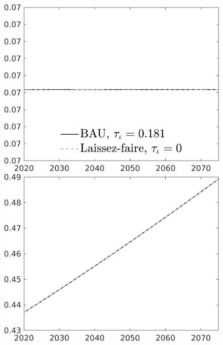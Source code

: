 \begin{figure}[h!!]
\begin{minipage}[]{0.32\textwidth}
\end{minipage}	
	\begin{minipage}[]{0.32\textwidth}
		\includegraphics[width=1\textwidth]{../../codding_model/own_basedOnFried/optimalPol_010922_revision/figures/all_13Sept22/CompTaul_Equlab_LFBAU_Reg0_GFF_spillover0_nsk1_xgr1_knspil1_sep1_countec0_GovRev1_etaa0.79_lgd1.png}
	\end{minipage}	
	\begin{minipage}[]{0.32\textwidth}
		\includegraphics[width=1\textwidth]{../../codding_model/own_basedOnFried/optimalPol_010922_revision/figures/all_13Sept22/CompTaul_Equlab_LFBAU_Reg0_EY_spillover0_nsk1_xgr1_knspil1_sep1_countec0_GovRev1_etaa0.79_lgd0.png}

\end{minipage}
\end{figure}
